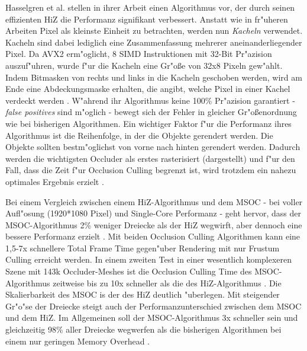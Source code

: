 \documentclass[journal]{vgtc}
\begin{document}
Hasselgren et al. \cite{MSOC} stellen in ihrer Arbeit einen Algorithmus vor, der durch seinen effizienten HiZ die Performanz signifikant verbessert. Anstatt wie in fr"uheren Arbeiten Pixel als kleinste Einheit zu betrachten, werden nun \textit{Kacheln} verwendet. Kacheln sind dabei lediglich eine Zusammenfassung mehrerer aneinanderliegender Pixel. Da AVX2 erm"oglicht, 8 SIMD Instruktionen mit 32-Bit Pr"azision auszuf"uhren, wurde f"ur die Kacheln eine Gr"o\ss{}e von 32x8 Pixeln gew"ahlt. Indem Bitmasken von rechts und links in die Kacheln geschoben werden, wird am Ende eine Abdeckungsmaske erhalten, die angibt, welche Pixel in einer Kachel verdeckt werden \cite{MSOC}.
W"ahrend ihr Algorithmus keine 100\% Pr"azision garantiert - \textit{false positives} sind m"oglich - bewegt sich der Fehler in gleicher Gr"o\ss{}enordnung wie bei bisherigen Algorithmen. Ein wichtiger Faktor f"ur die Performanz ihres Algorithmus ist die Reihenfolge, in der die Objekte gerendert werden. Die Objekte sollten bestm"oglichst von vorne nach hinten gerendert werden. Dadurch werden die wichtigsten Occluder als erstes rasterisiert (dargestellt) und f"ur den Fall, dass die Zeit f"ur Occlusion Culling begrenzt ist, wird trotzdem ein nahezu optimales Ergebnis erzielt \cite{MSOC}.

Bei einem Vergleich zwischen einem HiZ-Algorithmus und dem MSOC - bei voller Aufl"osung (1920*1080 Pixel) und Single-Core Performanz - geht hervor, dass der MSOC-Algorithmus 2\% weniger Dreiecke als der HiZ wegwirft, aber dennoch eine bessere Performanz erzielt \cite{MSOC}. Mit beiden Occlusion Culling Algorithmen kann eine 1,5-7x schnellere Total Frame Time gegen"uber Rendering mit nur Frustum Culling erreicht werden. In einem zweiten Test in einer wesentlich komplexeren Szene mit 143k Occluder-Meshes ist die Occlusion Culling Time des MSOC-Algorithmus zeitweise bis zu 10x schneller als die des HiZ-Algorithmus \cite{MSOC}. Die Skalierbarkeit des MSOC is der des HiZ deutlich "uberlegen. Mit steigender Gr"o"se der Dreiecke steigt auch der Performanzunterschied zwischen dem MSOC und dem HiZ. Im Allgemeinen soll der MSOC-Algorithmus 3x schneller sein und gleichzeitig 98\% aller Dreiecke wegwerfen als die bisherigen Algorithmen bei einem nur geringen Memory Overhead \cite{MSOC}.
\end{document}
